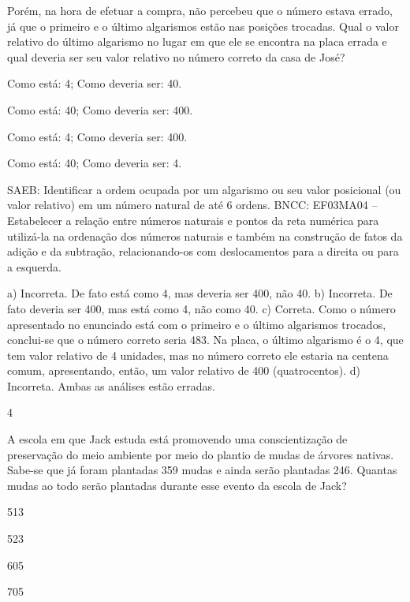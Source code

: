 \begin{multicols}{2}
{\begin{escolha}
{%

Porém, na hora de efetuar a compra, não percebeu que o número estava errado, já que o primeiro e o último algarismos estão nas posições
trocadas. Qual o valor relativo do último algarismo no lugar em que ele se
encontra na placa errada e qual deveria ser seu valor relativo no número correto da casa de José?

\begin{escolha}
\item
  Como está: 4; Como deveria ser: 40.
\item
  Como está: 40; Como deveria ser: 400.
\item
  Como está: 4; Como deveria ser: 400.
\item
  Como está: 40; Como deveria ser: 4.
\end{escolha}

SAEB: Identificar a ordem ocupada por um algarismo ou seu
valor posicional (ou valor relativo) em um número natural de até 6
ordens.
BNCC: EF03MA04 -- Estabelecer a relação entre números naturais e pontos da reta numérica para
utilizá-la na ordenação dos números naturais e também na construção de fatos da adição e da
subtração, relacionando-os com deslocamentos para a direita ou para a esquerda.

a) Incorreta. De fato está como 4, mas deveria ser 400, não 40.
b) Incorreta. De fato deveria ser 400, mas está como 4, não como 40.
c) Correta. Como o número apresentado no enunciado está com o primeiro e o último
algarismos trocados, conclui-se que o número correto seria 483. Na placa,
o último algarismo é o 4, que tem valor relativo de 4 unidades, mas no
número correto ele estaria na centena comum, apresentando, então, um valor
relativo de 400 (quatrocentos).
d) Incorreta. Ambas as análises estão erradas.

\num{4}

A escola em que Jack estuda está promovendo uma conscientização de
preservação do meio ambiente por meio do plantio de mudas de árvores
nativas. Sabe-se que já foram plantadas 359 mudas e ainda serão
plantadas 246. Quantas mudas ao todo serão plantadas durante esse evento
da escola de Jack?

\begin{escolha}
\item
  513
\item
  523
\item
  605
\item
  705
\end{escolha}

}
\end{escolha}}
\end{multicols}
